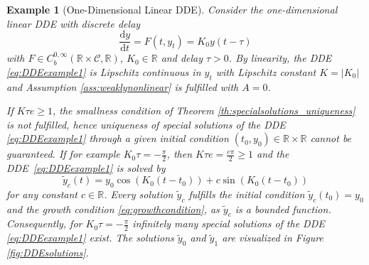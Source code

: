\documentclass[10pt]{article}
\numberwithin{equation}{section}
\newcommand*{\dd}{\mathrm{d}}
\newtheorem{example}[theorem]{Example}
\newcommand\abs[1]{\left\lvert#1\right\rvert}
\begin{document}
	
	\begin{example}[One-Dimensional Linear DDE] \label{ex:linear1} \normalfont
		Consider the one-dimensional linear DDE with discrete delay
		\begin{equation} \label{eq:DDEexample1}
			\frac{\dd y}{\dd t} = F(t,y_t) = K_0 y(t-\tau)
		\end{equation}
		with $F\in C^{0,\infty}_b(\mathbb{R}\times \mathcal{C},\mathbb{R})$, $K_0 \in \mathbb{R}$ and delay $\tau>0$. By linearity, the DDE \eqref{eq:DDEexample1} is Lipschitz continuous in $y_t$ with Lipschitz constant $K = \abs{K_0}$ and Assumption \ref{ass:weaklynonlinear} is fulfilled with $A = 0$.
		
		If  $K\tau e \geq 1$, the smallness condition of Theorem \ref{th:specialsolutions_uniqueness} is not fulfilled, hence uniqueness of special solutions of the DDE \eqref{eq:DDEexample1} through a given initial condition $(t_0,y_0)\in\mathbb{R}\times \mathbb{R}$ cannot be guaranteed. If for example $K_0\tau = - \frac{\pi}{2}$, then $K \tau e = \frac{e \pi}{2} \geq 1$ and the DDE~\eqref{eq:DDEexample1} is solved by
		\begin{equation*}
			\tilde y_c(t) = y_0 \cos(K_0(t-t_0))+ c \sin(K_0(t-t_0))
		\end{equation*}
		for any constant $c \in \mathbb{R}$. Every solution $ \tilde y_c$ fulfills the initial condition $\tilde y_c(t_0) = y_0$ and the growth condition \eqref{eq:growthcondition}, as $\tilde y_c$ is a bounded function. Consequently, for  $K_0\tau = - \frac{\pi}{2}$ infinitely many special solutions of the DDE \eqref{eq:DDEexample1} exist. The solutions $\tilde y_{0}$ and $\tilde y_{1}$ are visualized in Figure \ref{fig:DDEsolutions}.
		
	
		

\end{example}
\end{document}
